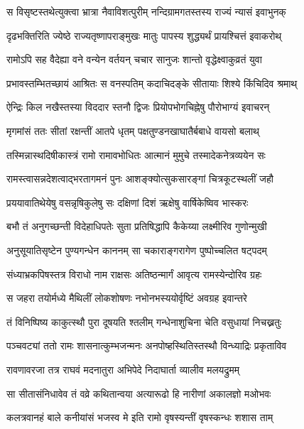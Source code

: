 \twolineshloka
{स विसृष्टस्तथेत्युक्त्वा भ्रात्रा नैवाविशत्पुरीम्}
{नन्दिग्रामगतस्तस्य राज्यं न्यासं इवाभुनक्}%

\twolineshloka
{दृढभक्तिरिति ज्येष्ठे राज्यतृष्णापराङ्मुखः}
{मातुः पापस्य शुद्ध्यर्थं प्रायश्चित्तं इवाकरोथ्}%

\twolineshloka
{रामोऽपि सह वैदेह्या वने वन्येन वर्तयन्}
{चचार सानुजः शान्तो वृद्धेक्ष्वाकुव्रतं युवा}%

\twolineshloka
{प्रभावस्तम्भितच्छायं आश्रितः स वनस्पतिम्}
{कदाचिदङ्के सीतायाः शिश्ये किंचिदिव श्रमाथ्}%

\twolineshloka
{ऐन्द्रिः किल नखैस्तस्या विददार स्तनौ द्विजः}
{प्रियोपभोगचिह्नेषु पौरोभाग्यं इवाचरन्}%

\twolineshloka
{मृगमांसं ततः सीतां रक्षन्तीं आतपे धृतम्}
{पक्षतुण्डनखाघातैर्बबाधे वायसो बलाथ्}%

\twolineshloka
{तस्मिन्नास्थदिषीकास्त्रं रामो रामावभोधितः}
{आत्मानं मुमुचे तस्मादेकनेत्रव्ययेन सः}%

\twolineshloka
{रामस्त्वासन्नदेशत्वाद्भरतागमनं पुनः}
{आशङ्क्योत्सुकसारङ्गां चित्रकूटस्थलीं जहौ}%

\twolineshloka
{प्रययावातिथेयेषु वसन्नृषिकुलेषु सः}
{दक्षिणां दिशं ऋक्षेषु वार्षिकेष्विव भास्करः}%

\twolineshloka
{बभौ तं अनुगच्छन्ती विदेहाधिपतेः सुता}
{प्रतिषिद्धापि कैकेय्या लक्ष्मीरिव गुणोन्मुखी}%

\twolineshloka
{अनुसूयातिसृष्टेन पुण्यगन्धेन काननम्}
{सा चकाराङ्गरागेण पुष्पोच्चलित षट्पदम्}%

\twolineshloka
{संध्याभ्रकपिषस्तत्र विराधो नाम राक्षसः}
{अतिष्ठन्मार्गं आवृत्य रामस्येन्दोरिव ग्रहः}%

\twolineshloka
{स जहरा तयोर्मध्ये मैथिलीं लोकशोषणः}
{नभोनभस्ययोर्वृष्टिं अवग्रह इवान्तरे}%

\twolineshloka
{तं विनिष्पिष्य काकुत्स्थौ पुरा दूषयति श्तलीम्}
{गन्धेनाशुचिना चेति वसुधायां निचख्नतुः}%

\twolineshloka
{पञ्चवट्यां ततो रामः शासनात्कुम्भजन्मनः}
{अनपोष्हस्थितिस्तस्थौ विन्ध्याद्रिः प्रकृताविव}%

\twolineshloka
{रावणावरजा तत्र राघवं मदनातुरा}
{अभिपेदे निदाघार्ता व्यालीव मलयद्रुमम्}%

\twolineshloka
{सा सीतासंनिधावेव तं वव्रे कथितान्वया}
{अत्यारूढो हि नारीणां अकालज्ञो मओभवः}%

\twolineshloka
{कलत्रवानहं बाले कनीयांसं भजस्व मे}
{इति रामो वृषस्यन्तीं वृषस्कन्धः शशास ताम्}%

